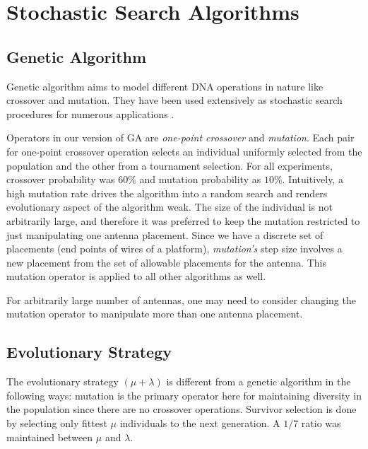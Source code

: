 \documentclass[conference]{IEEEtran}
\begin{document}
\section{Stochastic Search Algorithms}
\label{sec:algorithms}
\subsection{Genetic Algorithm}
\label{sec:algorithms-ga}
Genetic algorithm aims to model different DNA operations in nature like crossover and mutation. They have been used extensively as stochastic search procedures for numerous applications \cite{fogel1994}.

Operators in our version of GA are \textit{one-point crossover} and \textit{mutation}. Each pair for one-point crossover operation selects an individual uniformly selected from the population and the other from a tournament selection. For all experiments, crossover probability was $60\%$ and mutation probability as $10\%$. Intuitively, a high mutation rate drives the algorithm into a random search and renders evolutionary aspect of the algorithm weak. The size of the individual is not arbitrarily large, and therefore it was preferred to keep the mutation restricted to just manipulating one antenna placement. Since we have a discrete set of placements (end points of wires of a platform), \textit{mutation's} step size involves a new placement from the set of allowable placements for the antenna. This mutation operator is applied to all other algorithms as well.

For arbitrarily large number of antennas, one may need to consider changing the mutation operator to manipulate more than one antenna placement. 
\subsection{Evolutionary Strategy}
\label{sec:algorithms-es}
The evolutionary strategy $(\mu + \lambda)$ is different from a genetic algorithm in the following ways: 
mutation is the primary operator here for maintaining diversity in the population since there are no crossover operations. Survivor selection is done by selecting only fittest $\mu$ individuals to the next generation. A $1/7$ ratio was maintained between $\mu$ and $\lambda$. 
\end{document}
